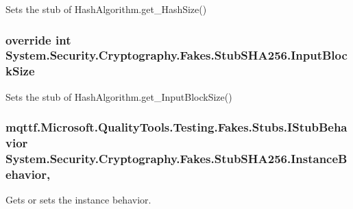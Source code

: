 Sets the stub of Hash\-Algorithm.\-get\-\_\-\-Hash\-Size()

\hypertarget{class_system_1_1_security_1_1_cryptography_1_1_fakes_1_1_stub_s_h_a256_a83dd91707c884c8e60ab6c823300b366}{
\subsubsection[{Input\-Block\-Size}]{\setlength{\rightskip}{0pt plus 5cm}override int System.\-Security.\-Cryptography.\-Fakes.\-Stub\-S\-H\-A256.\-Input\-Block\-Size\hspace{0.3cm}{\ttfamily [get]}}}\label{class_system_1_1_security_1_1_cryptography_1_1_fakes_1_1_stub_s_h_a256_a83dd91707c884c8e60ab6c823300b366}


Sets the stub of Hash\-Algorithm.\-get\-\_\-\-Input\-Block\-Size()

\hypertarget{class_system_1_1_security_1_1_cryptography_1_1_fakes_1_1_stub_s_h_a256_af0866633d7d6b28361270716b4921275}{
\subsubsection[{Instance\-Behavior}]{\setlength{\rightskip}{0pt plus 5cm}mqttf.\-Microsoft.\-Quality\-Tools.\-Testing.\-Fakes.\-Stubs.\-I\-Stub\-Behavior System.\-Security.\-Cryptography.\-Fakes.\-Stub\-S\-H\-A256.\-Instance\-Behavior\hspace{0.3cm}{\ttfamily [get]}, {\ttfamily [set]}}}\label{class_system_1_1_security_1_1_cryptography_1_1_fakes_1_1_stub_s_h_a256_af0866633d7d6b28361270716b4921275}


Gets or sets the instance behavior.


